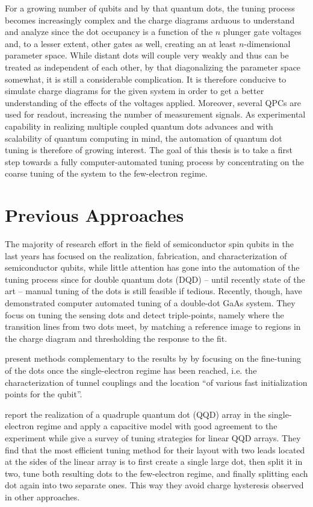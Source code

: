 For a growing number of qubits and by that quantum dots, the tuning process becomes increasingly complex and the charge diagrams arduous to understand and analyze since the dot occupancy is a function of the $n$ plunger gate voltages and, to a lesser extent, other gates as well, creating an at least $n$-dimensional parameter space. While distant dots will couple very weakly and thus can be treated as independent of each other, by that diagonalizing the parameter space somewhat, it is still a considerable complication. It is therefore conducive to simulate charge diagrams for the given system in order to get a better understanding of the effects of the voltages applied. Moreover, several QPCs are used for readout, increasing the number of measurement signals. As experimental capability in realizing multiple coupled quantum dots advances and with scalability of quantum computing in mind, the automation of quantum dot tuning is therefore of growing interest. The goal of this thesis is to take a first step towards a fully computer-automated tuning process by concentrating on the coarse tuning of the system to the few-electron regime.

\section{Previous Approaches}
The majority of research effort in the field of semiconductor spin qubits in the last years has focused on the realization, fabrication, and characterization of semiconductor qubits, while little attention has gone into the automation of the tuning process since for double quantum dots (DQD) -- until recently state of the art -- manual tuning of the dots is still feasible if tedious. Recently, though, \citet{Baart2016} have demonstrated computer automated tuning of a double-dot GaAs system. They focus on tuning the sensing dots and detect triple-points, namely where the transition lines from two dots meet, by matching a reference image to regions in the charge diagram and thresholding the response to the fit.

\citet{Botzem2016} present methods complementary to the results by \citeauthor{Baart2016} by focusing on the fine-tuning of the dots once the single-electron regime has been reached, i.e. the characterization of tunnel couplings and the location \enquote{of various fast initialization points for the qubit}.

\citet{Delbecq2014} report the realization of a quadruple quantum dot (QQD) array in the single-electron regime and apply a capacitive model with good agreement to the experiment while \citet{Bogan2016} give a survey of tuning strategies for linear QQD arrays. They find that the most efficient tuning method for their layout with two leads located at the sides of the linear array is to first create a single large dot, then split it in two, tune both resulting dots to the few-electron regime, and finally splitting each dot again into two separate ones. This way they avoid charge hysteresis observed in other approaches.

